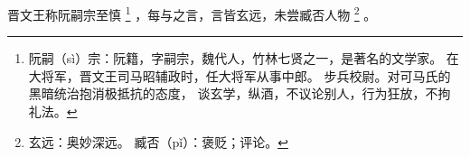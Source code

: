 
\switchcolumn*[\section{}]

晋文王称阮嗣宗至慎%
\footnote{%
    阮嗣（sì）宗：阮籍，字嗣宗，魏代人，竹林七贤之一，是著名的文学家。
                  在大将军，晋文王司马昭辅政时，任大将军从事中郎。
                  步兵校尉。对可马氏的黑暗统治抱消极抵抗的态度，
                  谈玄学，纵酒，不议论别人，行为狂放，不拘礼法。
}%
，每与之言，言皆玄远，未尝臧否人物%
\footnote{%
    玄远：奥妙深远。
    臧否（pǐ）：褒贬；评论。
}%
。

\switchcolumn


